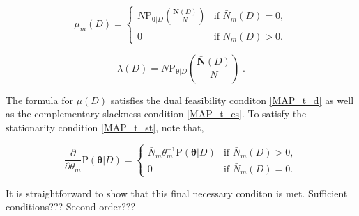 \documentclass[12pt]{report}
\begin{document}
\begin{equation}
\mu_m(D) = \begin{cases} N \text{P}_{\bm{\theta} | D} \left( \frac{\bar{\bm{N}}(D)}{N} \right) & \text{if } \bar{N}_m(D) = 0, \\ 0 & \text{if } \bar{N}_m(D) > 0. \end{cases}
\end{equation}

\begin{equation}
\lambda(D) =  N \text{P}_{\bm{\theta} | D} \left( \frac{\bar{\bm{N}}(D)}{N} \right) \;.
\end{equation}

The formula for $\mu(D)$ satisfies the dual feasibility conditon \eqref{MAP_t_d} as well as the complementary slackness condition \eqref{MAP_t_cs}. To satisfy the stationarity condition \eqref{MAP_t_st}, note that,

\begin{equation}
\frac{\partial}{\partial \theta_m} \text{P}(\bm{\theta} | D) = \begin{cases} \bar{N}_m \theta_m^{-1} \text{P}(\bm{\theta} | D) & \text{if } \bar{N}_m(D) > 0, \\ 0 & \text{if } \bar{N}_m(D) = 0. \end{cases}
\end{equation}

It is straightforward to show that this final necessary conditon is met. Sufficient conditions??? Second order???

\end{document}
